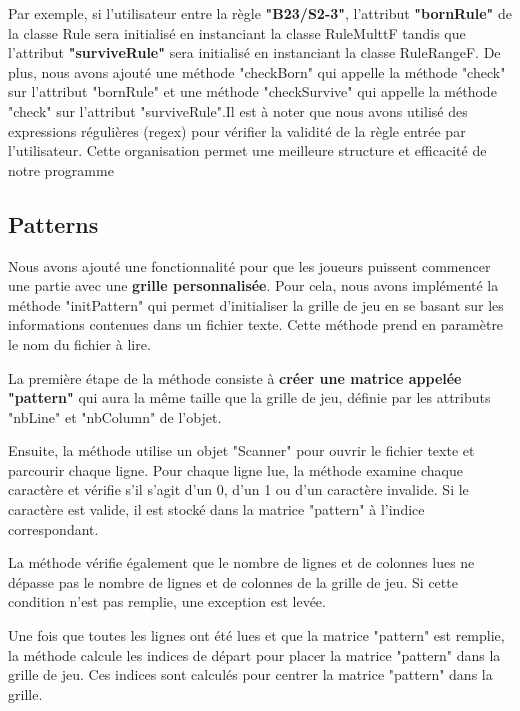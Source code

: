 Par exemple, si l'utilisateur entre la règle \textbf{"B23/S2-3"}, l'attribut \textbf{"bornRule"} de la classe Rule sera initialisé en instanciant la classe RuleMulttF tandis que l'attribut \textbf{"surviveRule"} sera initialisé en instanciant la classe RuleRangeF. De plus, nous avons ajouté une méthode "checkBorn" qui appelle la méthode "check" sur l'attribut "bornRule" et une méthode "checkSurvive" qui appelle la méthode "check" sur l'attribut "surviveRule".Il est à noter que nous avons utilisé des expressions régulières (regex) pour vérifier la validité de la règle entrée par l'utilisateur. Cette organisation permet une meilleure structure et efficacité de notre programme
\subsection{Patterns}
Nous avons ajouté une fonctionnalité pour que les joueurs puissent commencer une partie avec une \textbf{grille personnalisée}. Pour cela, nous avons implémenté la méthode "initPattern" qui permet d'initialiser la grille de jeu en se basant sur les informations contenues dans un fichier texte. Cette méthode prend en paramètre le nom du fichier à lire.

La première étape de la méthode consiste à \textbf{créer une matrice appelée "pattern"} qui aura la même taille que la grille de jeu, définie par les attributs "nbLine" et "nbColumn" de l'objet.

Ensuite, la méthode utilise un objet "Scanner" pour ouvrir le fichier texte et parcourir chaque ligne. Pour chaque ligne lue, la méthode examine chaque caractère et vérifie s'il s'agit d'un 0, d'un 1 ou d'un caractère invalide. Si le caractère est valide, il est stocké dans la matrice "pattern" à l'indice correspondant.

La méthode vérifie également que le nombre de lignes et de colonnes lues ne dépasse pas le nombre de lignes et de colonnes de la grille de jeu. Si cette condition n'est pas remplie, une exception est levée.

Une fois que toutes les lignes ont été lues et que la matrice "pattern" est remplie, la méthode calcule les indices de départ pour placer la matrice "pattern" dans la grille de jeu. Ces indices sont calculés pour centrer la matrice "pattern" dans la grille.

